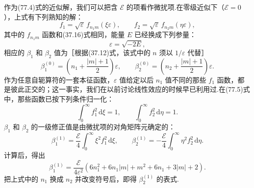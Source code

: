 作为(77.4)式的近似解，我们可以把含 $\mathcal{E}$ 的项看作微扰项.在零级近似下（$\mathcal{E}=0$），上式有下列熟知的解：
\begin{equation}
  f_1=\sqrt{\varepsilon}\,f_{n_1m}(\xi\varepsilon),
  \qquad
  f_2=\sqrt{\varepsilon}\,f_{n_2m}(\eta\varepsilon),
\end{equation}
其中的 $f_{n_1m}$ 函数和(37.16)式相同，能量 $E$ 已经换成下列参量：
\begin{equation}
  \varepsilon=\sqrt{-2E},
\end{equation}
相应的 $\beta_1$ 和 $\beta_2$ 值为［根据(37.12)式，该式中的 $n$ 须以 $1/\varepsilon$ 代替］
\begin{equation}
  \beta_1^{(0)}=\left(n_1+\frac{|m|+1}{2}\right)\varepsilon,
  \qquad
  \beta_2^{(0)}=\left(n_2+\frac{|m|+1}{2}\right)\varepsilon.
\end{equation}
作为任意自轭算符的一套本征函数，$\varepsilon$ 值给定以后 $n_1$ 值不同的那些 $f_1$ 函数，都是彼此正交的；这一事实，我们在以前讨论线性效应的时候早已利用过.在(77.5)式中，那些函数已按下列条件归一化：
\begin{equation*}
  \int_0^{\infty}f_1^{2}\,\mathrm{d}\xi=1,
  \qquad
  \int_0^{\infty}f_2^{2}\,\mathrm{d}\eta=1.
\end{equation*}
$\beta_1$ 和 $\beta_2$ 的一级修正值是由微扰项的对角矩阵元确定的：
\begin{equation*}
  \beta_1^{(1)}=\frac{\mathcal{E}}{4}\int_0^{\infty}\xi^{2}f_1^{2}\,\mathrm{d}\xi,
  \qquad
  \beta_2^{(1)}=-\frac{\mathcal{E}}{4}\int_0^{\infty}\eta^{2}f_2^{2}\,\mathrm{d}\eta.
\end{equation*}
计算后，得出
\begin{equation*}
  \beta_1^{(1)}=\frac{\mathcal{E}}{4\varepsilon^{2}}
  \left(6n_1^{2}+6n_1|m|+m^{2}+6n_1+3|m|+2\right).
\end{equation*}
把上式中的 $n_1$ 换成 $n_2$ 并改变符号后，即得 $\beta_2^{(1)}$ 的表式.

